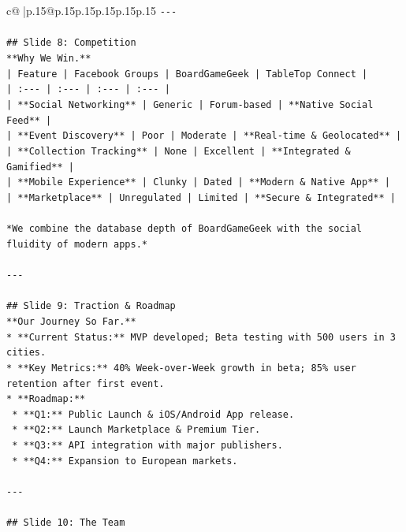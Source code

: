 \documentclass{article}
\begin{document}
{\begin{supertabular}{c@{$\;$}|p{.15\linewidth}@{}p{.15\linewidth}p{.15\linewidth}p{.15\linewidth}p{.15\linewidth}p{.15\linewidth}}
{{{\texttt{{-}{-}{-}} \\
\\ 
\texttt{\#\# Slide 8: Competition} \\
\texttt{**Why We Win.**} \\
\texttt{| Feature | Facebook Groups | BoardGameGeek | TableTop Connect |} \\
\texttt{| :{-}{-}{-} | :{-}{-}{-} | :{-}{-}{-} | :{-}{-}{-} |} \\
\texttt{| **Social Networking** | Generic | Forum{-}based | **Native Social Feed** |} \\
\texttt{| **Event Discovery** | Poor | Moderate | **Real{-}time \& Geolocated** |} \\
\texttt{| **Collection Tracking** | None | Excellent | **Integrated \& Gamified** |} \\
\texttt{| **Mobile Experience** | Clunky | Dated | **Modern \& Native App** |} \\
\texttt{| **Marketplace** | Unregulated | Limited | **Secure \& Integrated** |} \\
\\ 
\texttt{*We combine the database depth of BoardGameGeek with the social fluidity of modern apps.*} \\
\\ 
\texttt{{-}{-}{-}} \\
\\ 
\texttt{\#\# Slide 9: Traction \& Roadmap} \\
\texttt{**Our Journey So Far.**} \\
\texttt{*   **Current Status:** MVP developed; Beta testing with 500 users in 3 cities.} \\
\texttt{*   **Key Metrics:** 40\% Week{-}over{-}Week growth in beta; 85\% user retention after first event.} \\
\texttt{*   **Roadmap:**} \\
\texttt{    *   **Q1:** Public Launch \& iOS/Android App release.} \\
\texttt{    *   **Q2:** Launch Marketplace \& Premium Tier.} \\
\texttt{    *   **Q3:** API integration with major publishers.} \\
\texttt{    *   **Q4:** Expansion to European markets.} \\
\\ 
\texttt{{-}{-}{-}} \\
\\ 
\texttt{\#\# Slide 10: The Team} \\
}}}
\end{supertabular}}
\end{document}
